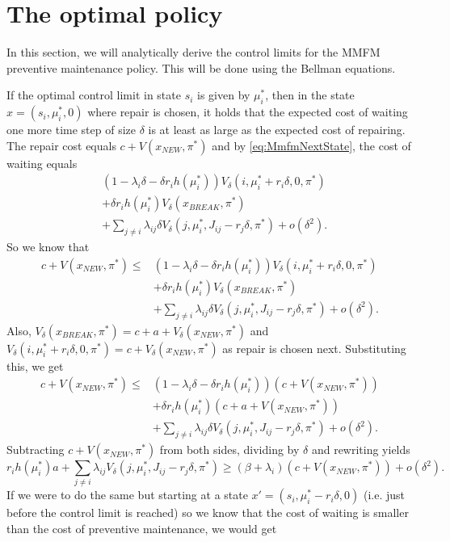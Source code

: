 \section{The optimal policy}
In this section, we will analytically derive the control limits for the MMFM preventive maintenance policy.
This will be done using the Bellman equations.

If the optimal control limit in state $s_i$ is given by $\mu_i^*$, then in the state $x=(s_i,\mu_i^*,0)$ where repair is chosen, it holds that the expected cost of waiting one more time step of size $\delta$ is at least as large as the expected cost of repairing.
The repair cost equals $c+V(x_{NEW},\pi^*)$ and by \eqref{eq:MmfmNextState}, the cost of waiting equals
\[
\begin{split}
&(1-\lambda_i \delta-\delta r_ih(\mu_i^*))V_\delta(i,\mu_i^*+r_i\delta,0,\pi^*)\\
&+ \delta r_ih(\mu_i^*)V_\delta(x_{BREAK},\pi^*)\\
&+\sum\limits_{j\neq i}\lambda_{ij} \delta V_\delta(j,\mu_i^*,J_{ij}-r_j\delta,\pi^*)+o(\delta^2).
\end{split}
\]
So we know that
\[
\begin{split}
c+V(x_{NEW},\pi^*)\leq 
&(1-\lambda_i \delta-\delta r_ih(\mu_i^*))V_\delta(i,\mu_i^*+r_i\delta,0,\pi^*)\\
&+ \delta r_ih(\mu_i^*)V_\delta(x_{BREAK},\pi^*)\\
&+\sum\limits_{j\neq i}\lambda_{ij} \delta V_\delta(j,\mu_i^*,J_{ij}-r_j\delta,\pi^*)+o(\delta^2).
\end{split}
\]
Also, $V_\delta(x_{BREAK},\pi^*)=c+a+V_\delta(x_{NEW},\pi^*)$ and $V_\delta(i,\mu_i^*+r_i\delta,0,\pi^*)=c+V_\delta(x_{NEW},\pi^*)$ as repair is chosen next.
Substituting this, we get
\[\begin{split}
c+V(x_{NEW},\pi^*)\leq
&(1-\lambda_i \delta-\delta r_ih(\mu_i^*))(c+V(x_{NEW},\pi^*))\\
&+ \delta r_ih(\mu_i^*)(c+a+V(x_{NEW},\pi^*))\\
&+\sum\limits_{j\neq i}\lambda_{ij} \delta V_\delta(j,\mu_i^*,J_{ij}-r_j\delta,\pi^*)+o(\delta^2).
\end{split}
\]
Subtracting $c+V(x_{NEW},\pi^*)$ from both sides, dividing by $\delta$ and rewriting yields
\[
r_ih(\mu_i^*)a+\sum\limits_{j\neq i}\lambda_{ij} V_\delta(j,\mu_i^*,J_{ij}-r_j\delta,\pi^*)\geq
(\beta+\lambda_i)(c+V(x_{NEW},\pi^*))+o(\delta^2).
\]
If we were to do the same but starting at a state $x'=(s_i,\mu_i^*-r_i\delta,0)$ (i.e. just before the control limit is reached) so we know that the cost of waiting is smaller than the cost of preventive maintenance, we would get
